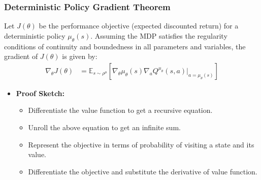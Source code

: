 \documentclass[9pt, aspectratio=169]{beamer}
\begin{document}
\begin{frame}
  \frametitle{Deterministic Policy Gradient Theorem}
    \begin{theorem}
        Let $J(\theta)$ be the performance objective (expected discounted return) for a deterministic policy $\mu_\theta(s)$. Assuming the MDP satisfies the regularity conditions of continuity and boundedness in all parameters and variables, the gradient of $J(\theta)$ is given by:
        \begin{align*}
        \nabla_\theta J(\theta) &= \mathbb{E}_{s \sim \rho^\mu} \left[ \nabla_\theta \mu_\theta(s) \nabla_a Q^{\mu_\theta}(s, a) |_{a=\mu_\theta(s)} \right]
        \end{align*}
    \end{theorem}

    \begin{itemize}
        \item \textbf{Proof Sketch:}
            \begin{itemize}
                \item Differentiate the value function to get a recursive equation.
                \item Unroll the above equation to get an infinite sum.
                \item Represent the objective in terms of probability of visiting a state and its value.
                \item Differentiate the objective and substitute the derivative of value function.
            \end{itemize}
    \end{itemize}
\end{frame}
\end{document}
